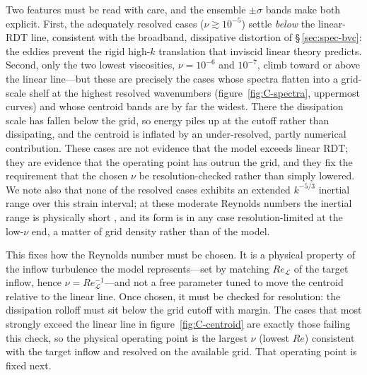\documentclass[lineno]{JFM-FLM_Au}
\begin{document}
Two features must be read with care, and the ensemble $\pm\sigma$ bands make
both explicit. First, the adequately resolved cases ($\nu\gtrsim10^{-5}$)
settle \emph{below} the linear-RDT line, consistent with the broadband,
dissipative distortion of \S\,\ref{sec:spec-bvc}: the eddies prevent the rigid
high-$k$ translation that inviscid linear theory predicts. Second, only the two
lowest viscosities, $\nu=10^{-6}$ and $10^{-7}$, climb toward or above the
linear line---but these are precisely the cases whose spectra flatten into a
grid-scale shelf at the highest resolved wavenumbers (figure~\ref{fig:C-spectra},
uppermost curves) and whose centroid bands are by far the widest. There the
dissipation scale has fallen below the grid, so energy piles up at the cutoff
rather than dissipating, and the centroid is inflated by an under-resolved,
partly numerical contribution. These cases are not evidence that the model
exceeds linear RDT; they are evidence that the operating point has outrun the
grid, and they fix the requirement that the chosen $\nu$ be resolution-checked
rather than simply lowered. We note also that none of the resolved cases
exhibits an extended $k^{-5/3}$ inertial range \citep{Kolmogorov1991} over this
strain interval; at these moderate Reynolds numbers the inertial range is
physically short \citep{Pope2000}, and its form is in any case resolution-limited
at the low-$\nu$ end, a matter of grid density rather than of the model.

This fixes how the Reynolds number must be chosen. It is a physical property of
the inflow turbulence the model represents---set by matching $Re_{\mathcal{L}}$
of the target inflow, hence $\nu=Re_{\mathcal{L}}^{-1}$---and not a free
parameter tuned to move the centroid relative to the linear line. Once chosen,
it must be checked for resolution: the dissipation rolloff must sit below the
grid cutoff with margin. The cases that most strongly exceed the linear line in
figure~\ref{fig:C-centroid} are exactly those failing this check, so the
physical operating point is the largest $\nu$ (lowest $Re$) consistent with the
target inflow and resolved on the available grid. That operating point is fixed
next.
\end{document}
